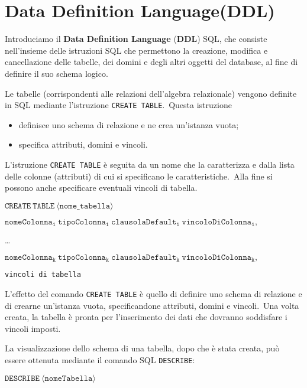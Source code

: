 \chapter{Data Definition Language(DDL)}

Introduciamo il \textbf{Data Definition Language} (\textbf{DDL}) SQL, che consiste nell'insieme delle istruzioni SQL che permettono la creazione, modifica e cancellazione delle tabelle, dei domini e degli altri oggetti del database, al fine di definire il suo schema logico.\

Le tabelle (corrispondenti alle relazioni dell'algebra relazionale) vengono definite in SQL mediante l'istruzione \texttt{CREATE TABLE}.\
Questa istruzione
\begin{itemize}
	\item definisce uno schema di relazione e ne crea un'istanza vuota;
	\item specifica attributi, domini e vincoli.
\end{itemize}
L'istruzione \texttt{CREATE TABLE} è seguita da un nome che la caratterizza e dalla lista delle colonne (attributi) di cui si specificano le caratteristiche.\
Alla fine si possono anche specificare eventuali vincoli di tabella.

\begin{flushleft}

	$\mathtt{CREATE\ TABLE\ \langle nome\_tabella\rangle}$

	\quad $\mathtt{nomeColonna_1\ tipoColonna_1\ clausolaDefault_1\ vincoloDiColonna_1,}$

	\quad \dots

	\quad $\mathtt{nomeColonna_k\ tipoColonna_k\ clausolaDefault_k\ vincoloDiColonna_k,}$

	\quad \texttt{vincoli di tabella}

\end{flushleft}

\noindent L'effetto del comando \texttt{CREATE TABLE} è quello di definire uno schema di relazione e di crearne un'istanza vuota, specificandone attributi, domini e vincoli.\
Una volta creata, la tabella è pronta per l'inserimento dei dati che dovranno soddisfare i vincoli imposti.\

La visualizzazione dello schema di una tabella, dopo che è stata creata, può essere ottenuta mediante il comando SQL \texttt{DESCRIBE}:
\begin{center}
	$\mathtt{DESCRIBE\ \langle nomeTabella\rangle}$
\end{center}

